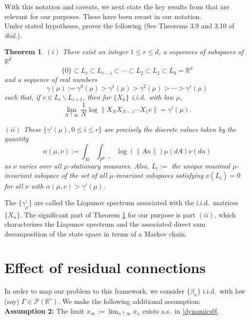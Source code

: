 \documentclass[12pt]{amsart}
\theoremstyle{plain}
\newtheorem{theorem}{Theorem}[section]
\theoremstyle{definition}
\theoremstyle{remark}
\newcommand{\R}{\mathbb{R}}
\newcommand{\M}{\mathcal{M}}
\newcommand{\PA}{\mathcal{P}}
\newcommand{\0}{\textbf{0}}
\begin{document}
\medskip

With this notation and caveats, we next state the key results from \cite{FK} that are relevant for our purposes. These have been recast in our notation.\\

Under stated hypotheses, \cite{FK} proves the following (See Theorems 3.9 and 3.10 of \textit{ibid.}).

\begin{theorem}\label{FuKe} $(i)$ There exist an integer $1 \leq r \leq d$, a sequences of subspaces of $\R^d$
$$\{0\} \subset L_r \subset L_{r-1} \subset \cdots \subset L_2 \subset L_1 \subset L_0 = \R^d$$
and a sequence of real numbers
$$\gamma(\mu) := \gamma^0(\mu) > \gamma^1(\mu) > \gamma^2(\mu) > \cdots > \gamma^r(\mu)$$
such that, if $v\in L_i\backslash L_{i+1}$, then for $\{X_n\}$ i.i.d.\ with law $\mu$,
$$\lim_{N\uparrow\infty}\frac{1}{N}\log\left\|X_NX_{N-1}\cdots X_1v\right\| = \gamma^i(\mu).$$

$(ii)$ These $\{\gamma^i(\mu), 0 \leq i \leq r\}$ are precisely the discrete values taken by the quantity
\begin{equation}
\alpha(\mu,\nu) := \int_\M\int_{P^{d-1}}\log\left(\|Au\|\right)\mu(dA)\nu(du) \label{alpha}
\end{equation}
as $\nu$ varies over all $\mu$-stationary measures. Also, $L_i :=$ the unique maximal $\mu$-invariant subspace of the set of all $\mu$-invariant subspaces satisfying $\nu(\overline{L}_i) = 0$ for all $\nu$ with $\alpha(\mu,\nu) > \gamma^i(\mu)$.
\end{theorem}

The $\{\gamma^i_\mu\}$ are called the Liapunov spectrum associated with the i.i.d.\ matrices $\{X_n\}$. The significant part of Theorem \ref{FuKe} for our purpose is part $(ii)$, which characterizes the Liapunov spectrum and the associated direct sum decomposition of the state space in terms of a Markov chain.\\

\section{Effect of residual connections}\label{resnet}

In order to map our problem to this framework, we consider $\{\beta_n\}$ i.i.d.\ with law (say) $\Gamma \in \PA(\R^s)$. We make the following additional assumption:\\

\noindent \textbf{Assumption 2:} The limit $x_\infty := \lim_{n\uparrow\infty}x_n$ exists a.s.\ in \eqref{dynamics0}.\\
\end{document}
